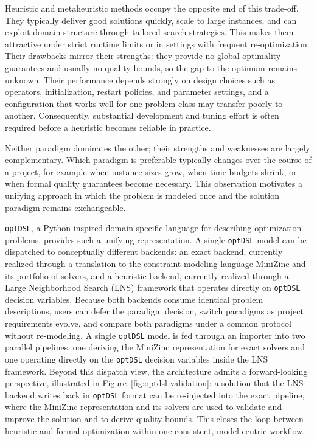 \documentclass[11pt,a4paper]{article}
\begin{document}
Heuristic and metaheuristic methods occupy the opposite end of this trade-off.
They typically deliver good solutions quickly, scale to large instances, and can exploit domain structure through tailored search strategies.
This makes them attractive under strict runtime limits or in settings with frequent re-optimization.
Their drawbacks mirror their strengths: they provide no global optimality guarantees and usually no quality bounds, so the gap to the optimum remains unknown.
Their performance depends strongly on design choices such as operators, initialization, restart policies, and parameter settings, and a configuration that works well for one problem class may transfer poorly to another.
Consequently, substantial development and tuning effort is often required before a heuristic becomes reliable in practice.

Neither paradigm dominates the other; their strengths and weaknesses are largely complementary.
Which paradigm is preferable typically changes over the course of a project, for example when instance sizes grow, when time budgets shrink, or when formal quality guarantees become necessary.
This observation motivates a unifying approach in which the problem is modeled once and the solution paradigm remains exchangeable.

\texttt{optDSL}, a Python-inspired domain-specific language for describing optimization problems, provides such a unifying representation.
A single \texttt{optDSL} model can be dispatched to conceptually different backends:
an exact backend, currently realized through a translation to the constraint modeling language MiniZinc and its portfolio of solvers, and
a heuristic backend, currently realized through a Large Neighborhood Search (LNS) framework that operates directly on \texttt{optDSL} decision variables.
Because both backends consume identical problem descriptions, users can defer the paradigm decision, switch paradigms as project requirements evolve, and compare both paradigms under a common protocol without re-modeling.
A single \texttt{optDSL} model is fed through an importer into two parallel pipelines, one deriving the MiniZinc representation for exact solvers and one operating directly on the \texttt{optDSL} decision variables inside the LNS framework.
Beyond this dispatch view, the architecture admits a forward-looking perspective, illustrated in Figure~\ref{fig:optdsl-validation}: a solution that the LNS backend writes back in \texttt{optDSL} format can be re-injected into the exact pipeline, where the MiniZinc representation and its solvers are used to validate and improve the solution and to derive quality bounds. This closes the loop between heuristic and formal optimization within one consistent, model-centric workflow.
\end{document}
